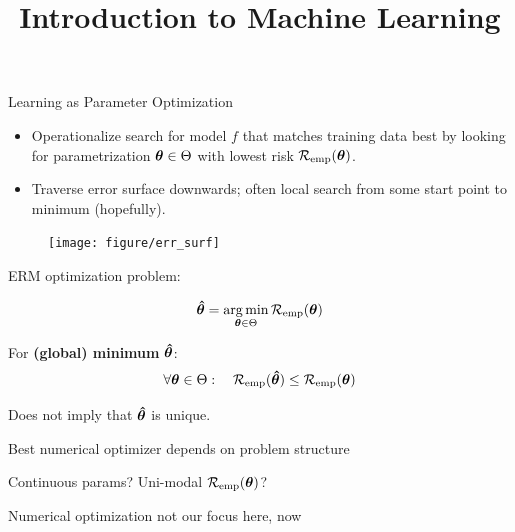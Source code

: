 \documentclass[11pt,compress,t,notes=noshow, xcolor=table]{beamer}
\title{Introduction to Machine Learning}
\begin{document}


\begin{vbframe}{Learning as Parameter Optimization}
\begin{itemize}
\item Operationalize search for model $f$ that matches
    training data best by looking for parametrization $\bm{\theta} \in \Theta$
    with lowest risk $\mathcal{R}_{\text{emp}}(\bm{\theta})$.
\item Traverse error surface downwards; often local search from some start point to minimum (hopefully).
\end{itemize}

\vfill

\begin{center}
\begin{figure}[!b]
\texttt{[image: figure/err\_surf]}
\end{figure}
\end{center}

\framebreak

ERM optimization problem:

\[
\bm{\hat\theta}  = \mathop{\mathrm{arg\,min}}_{\bm{\theta} \in \Theta} \mathcal{R}_{\text{emp}}(\bm{\theta}) 
\]

For \textbf{(global) minimum} $\bm{\hat\theta}$:
\[
\forall \bm{\theta} \in \Theta :\quad \mathcal{R}_{\text{emp}}(\bm{\hat\theta}) \leq \mathcal{R}_{\text{emp}}(\bm{\theta}) 
\]

Does not imply that $\bm{\hat\theta}$ is unique. \\
\lz

\begin{itemizeM}
\item Best numerical optimizer depends on problem structure
\item Continuous params? Uni-modal $\mathcal{R}_{\text{emp}}(\bm{\theta})$? 
\item Numerical optimization not our focus here, now
\end{itemizeM}

\end{vbframe}
\end{document}
